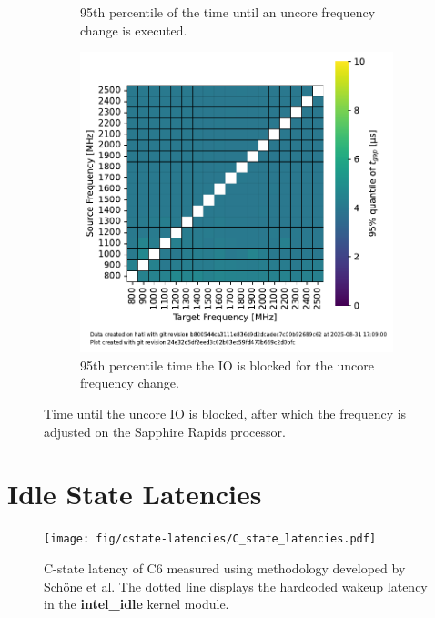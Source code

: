 \begin{figure}[]
\begin{subfigure}[t]{0.3\linewidth}
        \caption{\label{fig:ufs_init_95}95th percentile of the time until an uncore frequency change is executed.}
    \end{subfigure}
    \hfill
    \begin{subfigure}[t]{0.3\linewidth}
        \centering
        \includegraphics[width=\linewidth]{fig/uncore-frequency-switching-latency/95percentile-t-gap.pdf}
        \caption{\label{fig:ufs_gap_95}95th percentile time the IO is blocked for the uncore frequency change.}
    \end{subfigure}
    \caption{Time until the uncore IO is blocked, after which the frequency is adjusted on the Sapphire Rapids processor.}
\end{figure}

\section{Idle State Latencies}

\begin{figure}[!ht]
    \centering
    \texttt{[image: fig/cstate-latencies/C\_state\_latencies.pdf]}
    \caption{\label{fig:c6_latencies}C-state latency of C6 measured using methodology developed by Schöne et al.
The dotted line displays the hardcoded wakeup latency in the \protect\textbf{intel\_idle} kernel module.
\protect\footnotemark}
\end{figure}

